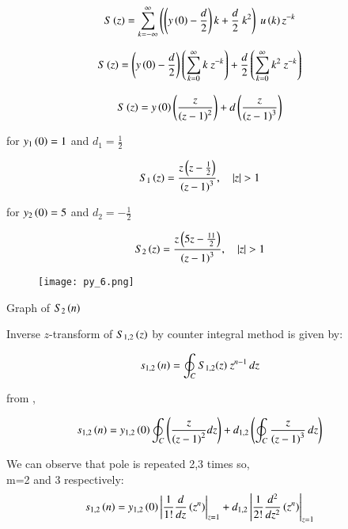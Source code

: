 \documentclass[beamer]{IEEEtran}
\theoremstyle{remark}
\begin{document}
\begin{align}
S\brak{z}&=\sum_{k=-\infty}^{\infty}\left(\brak{y\brak{0}-\frac{d}{2}}k+\frac{d}{2}\ k^2\right)\ u\brak{k}z^{-k}
\end{align}

\begin{align}
\label{q17}
    S\brak{z}&=\brak{y\brak{0}-\frac{d}{2}}\left(\sum_{k=0}^{\infty}k\ z^{-k}\right)+\frac{d}{2}\left(\sum_{k=0}^{\infty}k^2\ z^{-k}\right)
\end{align}

\begin{align}
\label{w1}
S\left(z\right)&=y\left(0\right)\left(\frac{z}{\left(z-1\right)^2}\right)+d\left(\frac{z}{\left(z-1\right)^3}\right)
\end{align}

for $y_1\left(0\right)=1$ and $d_1=\frac{1}{2}$

\begin{align}
S_1\brak{z}&=\frac{z\brak{z-\frac{1}{2}}}{\brak{z-1}^3},\quad |z|>1
\end{align}



for $y_2\left(0\right)=5$ and $d_2=-\frac{1}{2}$

\begin{align}S_2\brak{z}&=\frac{z\brak{5z-\frac{11}{2}}}{\brak{z-1}^3},\quad |z|>1\end{align}

\begin{figure}[h]
    \centering
    \texttt{[image: py\_6.png]}
    \label{s2n}
\end{figure}

\begin{center}
Graph of $S_2\left(n\right)$
\end{center}

Inverse $z$-transform of $S_{1,2}\left(z\right)$ by counter integral method is given by:

\begin{align}
s_{1,2}\left(n\right)&=\oint_C S_{1,2}(z)\ z^{n-1}\, dz
\end{align}

from \brak{\ref{w1}},

\begin{align}
    s_{1,2}\left(n\right)&=y_{1,2}\left(0\right)\oint_C \left(\frac{z}{\left(z-1\right)^2}dz\right) + d_{1,2}\left(\oint_C  \frac{z}{\left(z-1\right)^3} \, dz\right)
\end{align}

We can observe that pole is repeated 2,3 times so,\\m=2 and 3 respectively:
\begin{align}
    s_{1,2}\left(n\right)&=y_{1,2}\left(0\right)\left|\frac{1}{1!}\frac{d}{dz}\left(z^n\right)\right|_{z=1} + d_{1,2}\left|\frac{1}{2!}\frac{d^2}{dz^2}\left(z^n\right)\right|_{z=1}
\end{align}
\end{document}
